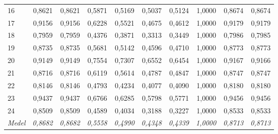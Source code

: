 \begin{table}[H]
{\begin{tabular}{lrrrrrrrrr}
16 & 0{,}8621 & 0{,}8621 & 0{,}5871 & 0{,}5169 & 0{,}5037 & 0{,}5124 & 1{,}0000 & 0{,}8674 & 0{,}8674 \\
17 & 0{,}9156 & 0{,}9156 & 0{,}6228 & 0{,}5521 & 0{,}4675 & 0{,}4612 & 1{,}0000 & 0{,}9179 & 0{,}9179 \\
18 & 0{,}7959 & 0{,}7959 & 0{,}4376 & 0{,}3871 & 0{,}3313 & 0{,}3449 & 1{,}0000 & 0{,}7986 & 0{,}7985 \\
19 & 0{,}8735 & 0{,}8735 & 0{,}5681 & 0{,}5142 & 0{,}4596 & 0{,}4710 & 1{,}0000 & 0{,}8773 & 0{,}8773 \\
20 & 0{,}9149 & 0{,}9149 & 0{,}7554 & 0{,}7307 & 0{,}6552 & 0{,}6454 & 1{,}0000 & 0{,}9167 & 0{,}9166 \\
21 & 0{,}8716 & 0{,}8716 & 0{,}6119 & 0{,}5614 & 0{,}4787 & 0{,}4847 & 1{,}0000 & 0{,}8747 & 0{,}8747 \\
22 & 0{,}8146 & 0{,}8146 & 0{,}4793 & 0{,}4234 & 0{,}4077 & 0{,}4090 & 1{,}0000 & 0{,}8180 & 0{,}8180 \\
23 & 0{,}9437 & 0{,}9437 & 0{,}6766 & 0{,}6285 & 0{,}5798 & 0{,}5771 & 1{,}0000 & 0{,}9456 & 0{,}9456 \\
24 & 0{,}8509 & 0{,}8509 & 0{,}4589 & 0{,}4034 & 0{,}3188 & 0{,}3227 & 1{,}0000 & 0{,}8533 & 0{,}8533 \\
\hline
\textit{Medel} & \textit{0{,}8682} & \textit{0{,}8682} & \textit{0{,}5558} & \textit{0{,}4990} & \textit{0{,}4348} & \textit{0{,}4339} & \textit{1{,}0000} & \textit{0{,}8713} & \textit{0{,}8713} \\
\hline
\end{tabular}
}
\end{table}

